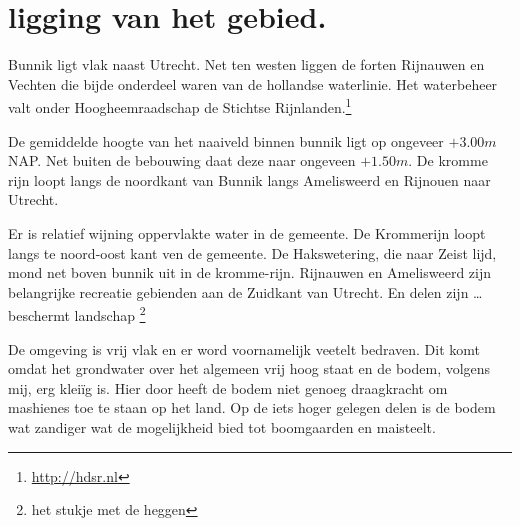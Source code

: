 \section{ligging van het gebied.}
Bunnik ligt vlak naast Utrecht.
Net ten westen liggen de forten Rijnauwen en Vechten die bijde onderdeel waren van de hollandse waterlinie.
Het waterbeheer valt onder Hoogheemraadschap de Stichtse Rijnlanden.\footnote{\url{http://hdsr.nl}}

De gemiddelde hoogte van het naaiveld binnen bunnik ligt op ongeveer $+3.00 m$ NAP.
Net buiten de bebouwing daat deze naar ongeveen $+1.50 m$.
De kromme rijn loopt langs de noordkant van Bunnik langs Amelisweerd en Rijnouen naar Utrecht.

Er is relatief wijning oppervlakte water in de gemeente.
De Krommerijn loopt langs te noord-oost kant ven de gemeente.
De Hakswetering, die naar Zeist lijd, mond net boven bunnik uit in de kromme-rijn.
Rijnauwen en Amelisweerd zijn belangrijke recreatie gebienden aan de Zuidkant van Utrecht.
En delen zijn \ldots beschermt landschap \footnote{het stukje met de heggen}

De omgeving is vrij vlak en er word voornamelijk veetelt bedraven.
Dit komt omdat het grondwater over het algemeen vrij hoog staat en de bodem, volgens mij, erg klei\"ig is.
Hier door heeft de bodem niet genoeg draagkracht om mashienes toe te staan op het land.
Op de iets hoger gelegen delen is de bodem wat zandiger wat de mogelijkheid bied tot boomgaarden en maisteelt.




